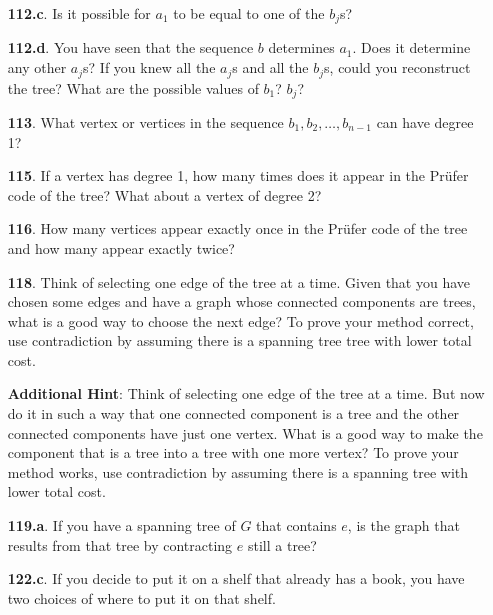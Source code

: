 \documentclass[10pt,]{book}
\theoremstyle{plain}
\theoremstyle{definition}
\theoremstyle{definition}
\numberwithin{equation}{chapter}
\begin{document}
\begin{itemize}[itemsep=1em]
\item[\textbf{112.c}.]\hypertarget{p-639}{}%
Is it possible for \(a_1\) to be equal to one of the \(b_j\)s?%

\item[\textbf{112.d}.]\hypertarget{p-641}{}%
You have seen that the sequence \(b\) determines \(a_1\). Does it determine any other \(a_j\)s? If you knew all the \(a_j\)s and all the \(b_j\)s, could you reconstruct the tree? What are the possible values of \(b_1\)? \(b_j\)?%

\item[\textbf{113}.]\hypertarget{p-644}{}%
What vertex or vertices in the sequence \(b_1,b_2,\ldots,b_{n-1}\) can have degree 1?%

\item[\textbf{115}.]\hypertarget{p-648}{}%
If a vertex has degree 1, how many times does it appear in the Prüfer code of the tree? What about a vertex of degree 2?%

\item[\textbf{116}.]\hypertarget{p-651}{}%
How many vertices appear exactly once in the Prüfer code of the tree and how many appear exactly twice?%

\item[\textbf{118}.]\hypertarget{p-661}{}%
Think of selecting one edge of the tree at a time. Given that you have chosen some edges and have a graph whose connected components are trees, what is a good way to choose the next edge? To prove your method correct, use contradiction by assuming there is a spanning tree tree with lower total cost.%

\par\smallskip
\noindent\textbf{Additional Hint}: \hypertarget{p-662}{}%
Think of selecting one edge of the tree at a time. But now do it in such a way that one connected component is a tree and the other connected components have just one vertex. What is a good way to make the component that is a tree into a tree with one more vertex? To prove your method works, use contradiction by assuming there is a spanning tree with lower total cost.%

\item[\textbf{119.a}.]\hypertarget{p-675}{}%
If you have a spanning tree of \(G\) that contains \(e\), is the graph that results from that tree by contracting \(e\) still a tree?%

\item[\textbf{122.c}.]\hypertarget{p-741}{}%
If you decide to put it on a shelf that already has a book, you have two choices of where to put it on that shelf.%


\end{itemize}
\end{document}
